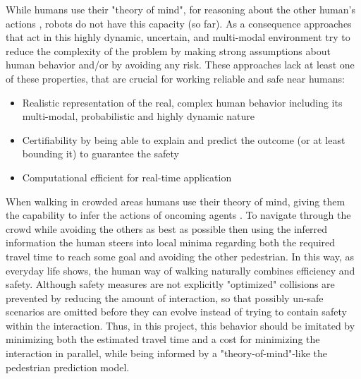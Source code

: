 While humans use their "theory of mind", for reasoning about the other human's actions \cite{Gweon2013}, robots do not have this capacity (so far). As a consequence approaches that act in this highly dynamic, uncertain, and multi-modal environment try to reduce the complexity of the problem by making strong assumptions about human behavior and/or by avoiding any risk. These approaches lack at least one of these properties, that are crucial for working reliable and safe near humans: 

\begin{itemize}
\item Realistic representation of the real, complex human behavior including its multi-modal, probabilistic and highly dynamic nature
\item Certifiability by being able to explain and predict the outcome (or at least bounding it) to guarantee the safety 
\item Computational efficient for real-time application
\end{itemize}

When walking in crowded areas humans use their theory of mind, giving them the capability to infer the actions of oncoming agents \cite{Ivanovic2018} \cite{Gweon2013}. To navigate through the crowd while avoiding the others as best as possible then using the inferred information the human steers into local minima regarding both the required travel time to reach some goal and avoiding the other pedestrian. In this way, as everyday life shows, the human way of walking naturally combines efficiency and safety. Although safety measures are not explicitly "optimized" collisions are prevented by reducing the amount of interaction, so that possibly un-safe scenarios are omitted before they can evolve instead of trying to contain safety within the interaction. Thus, in this project, this behavior should be imitated by minimizing both the estimated travel time and a cost for minimizing the interaction in parallel, while being informed by a "theory-of-mind"-like the pedestrian prediction model. 




